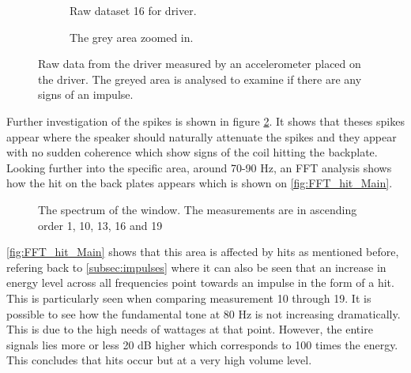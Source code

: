 \begin{figure}[H]
\centering
\begin{subfigure}[t]{0.55\textwidth}
	
	\caption{Raw dataset 16 for driver.}
	\label{fig:raw_driver19_window_main}
\end{subfigure}
\begin{subfigure}[t]{0.43\textwidth}
	
	\caption{The grey area zoomed in.}
	\label{fig:raw_driver19_window_zoom_main}
\end{subfigure}
\caption{Raw data from the driver measured by an accelerometer placed on the driver. The greyed area is analysed to examine if there are any signs of an impulse.}
\label{fig:raw_driver19_windows_main}
\end{figure}

Further investigation of the spikes is shown in figure \ref{fig:raw_driver19_window_zoom_main}. It shows that theses spikes appear where the speaker should naturally attenuate the spikes and they appear with no sudden coherence which show signs of the coil hitting the backplate. Looking further into the specific area, around 70-90 Hz, an FFT analysis shows how the hit on the back plates appears which is shown on \autoref{fig:FFT_hit_Main}.

\begin{figure}[H]
\centering
{}

\caption{The spectrum of the window. The measurements are in ascending order 1, 10, 13, 16 and 19}
\label{fig:FFT_hit_Main}
\end{figure}

\autoref{fig:FFT_hit_Main} shows that this area is affected by hits as mentioned before, refering back to \autoref{subsec:impulses} where it can also be seen that an increase in energy level across all frequencies point towards an impulse in the form of a hit. This is particularly seen when comparing measurement 10 through 19. It is possible to see how the fundamental tone at 80 Hz is not increasing dramatically. This is due to the high needs of wattages at that point. However, the entire signals lies more or less 20 dB higher which corresponds to 100 times the energy. This concludes that hits occur but at a very high volume level.





